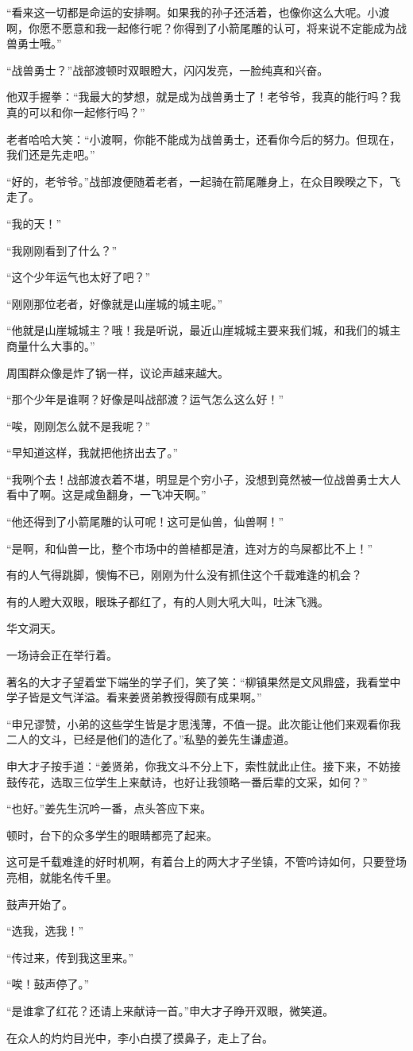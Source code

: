 \begin{this_body}
“看来这一切都是命运的安排啊。如果我的孙子还活着，也像你这么大呢。小渡啊，你愿不愿意和我一起修行呢？你得到了小箭尾雕的认可，将来说不定能成为战兽勇士哦。”

“战兽勇士？”战部渡顿时双眼瞪大，闪闪发亮，一脸纯真和兴奋。

他双手握拳：“我最大的梦想，就是成为战兽勇士了！老爷爷，我真的能行吗？我真的可以和你一起修行吗？”

老者哈哈大笑：“小渡啊，你能不能成为战兽勇士，还看你今后的努力。但现在，我们还是先走吧。”

“好的，老爷爷。”战部渡便随着老者，一起骑在箭尾雕身上，在众目睽睽之下，飞走了。

“我的天！”

“我刚刚看到了什么？”

“这个少年运气也太好了吧？”

“刚刚那位老者，好像就是山崖城的城主呢。”

“他就是山崖城城主？哦！我是听说，最近山崖城城主要来我们城，和我们的城主商量什么大事的。”

周围群众像是炸了锅一样，议论声越来越大。

“那个少年是谁啊？好像是叫战部渡？运气怎么这么好！”

“唉，刚刚怎么就不是我呢？”

“早知道这样，我就把他挤出去了。”

“我咧个去！战部渡衣着不堪，明显是个穷小子，没想到竟然被一位战兽勇士大人看中了啊。这是咸鱼翻身，一飞冲天啊。”

“他还得到了小箭尾雕的认可呢！这可是仙兽，仙兽啊！”

“是啊，和仙兽一比，整个市场中的兽植都是渣，连对方的鸟屎都比不上！”

有的人气得跳脚，懊悔不已，刚刚为什么没有抓住这个千载难逢的机会？

有的人瞪大双眼，眼珠子都红了，有的人则大吼大叫，吐沫飞溅。

华文洞天。

一场诗会正在举行着。

著名的大才子望着堂下端坐的学子们，笑了笑：“柳镇果然是文风鼎盛，我看堂中学子皆是文气洋溢。看来姜贤弟教授得颇有成果啊。”

“申兄谬赞，小弟的这些学生皆是才思浅薄，不值一提。此次能让他们来观看你我二人的文斗，已经是他们的造化了。”私塾的姜先生谦虚道。

申大才子按手道：“姜贤弟，你我文斗不分上下，索性就此止住。接下来，不妨接鼓传花，选取三位学生上来献诗，也好让我领略一番后辈的文采，如何？”

“也好。”姜先生沉吟一番，点头答应下来。

顿时，台下的众多学生的眼睛都亮了起来。

这可是千载难逢的好时机啊，有着台上的两大才子坐镇，不管吟诗如何，只要登场亮相，就能名传千里。

鼓声开始了。

“选我，选我！”

“传过来，传到我这里来。”

“唉！鼓声停了。”

“是谁拿了红花？还请上来献诗一首。”申大才子睁开双眼，微笑道。

在众人的灼灼目光中，李小白摸了摸鼻子，走上了台。

\end{this_body}

